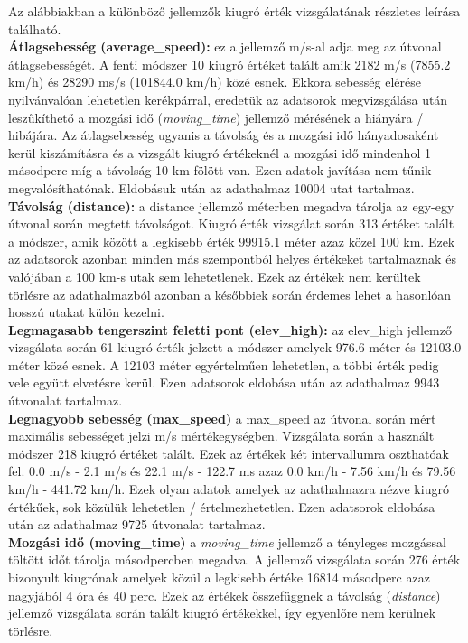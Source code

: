 Az alábbiakban a különböző jellemzők kiugró érték vizsgálatának részletes leírása található.\\[6pt]

\textbf{Átlagsebesség (average\_speed):}
ez a jellemző m/s-al adja meg az útvonal átlagsebességét. A fenti módszer 10 kiugró értéket talált amik 2182 m/s (7855.2 km/h) és 28290 ms/s (101844.0 km/h) közé esnek. Ekkora sebesség elérése nyilvánvalóan lehetetlen kerékpárral, eredetük az adatsorok megvizsgálása után leszűkíthető a mozgási idő (\textit{moving\_time}) jellemző mérésének a hiányára / hibájára. Az átlagsebesség ugyanis a távolság és a mozgási idő hányadosaként kerül kiszámításra és a vizsgált kiugró értékeknél a mozgási idő mindenhol 1 másodperc míg a távolság 10 km fölött van. Ezen adatok javítása nem tűnik megvalósíthatónak. Eldobásuk után az adathalmaz 10004 utat tartalmaz.\\[6pt]

\textbf{Távolság (distance):}
a distance jellemző méterben megadva tárolja az egy-egy útvonal során megtett távolságot. Kiugró érték vizsgálat során 313 értéket talált a módszer, amik között a legkisebb érték 99915.1 méter azaz közel 100 km. Ezek az adatsorok azonban minden más szempontból helyes értékeket tartalmaznak és valójában a 100 km-s utak sem lehetetlenek. Ezek az értékek nem kerültek törlésre az adathalmazból azonban a későbbiek során érdemes lehet a hasonlóan hosszú utakat külön kezelni.\\[6pt]

\textbf{Legmagasabb tengerszint feletti pont (elev\_high):}
az elev\_high jellemző vizsgálata során 61 kiugró érték jelzett a módszer amelyek 976.6 méter és 12103.0 méter közé esnek. A 12103 méter egyértelműen lehetetlen, a többi érték pedig vele együtt elvetésre kerül. Ezen adatsorok eldobása után az adathalmaz 9943 útvonalat tartalmaz.\\[6pt]

\textbf{Legnagyobb sebesség (max\_speed)}
a max\_speed az útvonal során mért maximális sebességet jelzi m/s mértékegységben. Vizsgálata során a használt módszer 218 kiugró értéket talált. Ezek az értékek két intervallumra oszthatóak fel. 0.0 m/s - 2.1 m/s és 22.1 m/s - 122.7 ms azaz 0.0 km/h - 7.56 km/h és 79.56 km/h - 441.72 km/h. Ezek olyan adatok amelyek az adathalmazra nézve kiugró értékűek, sok közülük lehetetlen / értelmezhetetlen. Ezen adatsorok eldobása után az adathalmaz 9725 útvonalat tartalmaz.\\[6pt]

\textbf{Mozgási idő (moving\_time)}
a \textit{moving\_time} jellemző a tényleges mozgással töltött időt tárolja másodpercben megadva. A jellemző vizsgálata során 276 érték bizonyult kiugrónak amelyek közül a legkisebb értéke 16814 másodperc azaz nagyjából 4 óra és 40 perc. Ezek az értékek összefüggnek a távolság (\textit{distance}) jellemző vizsgálata során talált kiugró értékekkel, így egyenlőre nem kerülnek törlésre.

